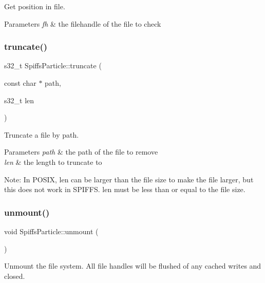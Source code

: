 Get position in file. 


\begin{DoxyParams}{Parameters}
{\em fh} & the filehandle of the file to check \\
\hline
\end{DoxyParams}
\mbox{\label{class_spiffs_particle_af52be85536c06520864bd4918b3fe927}} 
\subsubsection{\texorpdfstring{truncate()}{truncate()}}
{\footnotesize\ttfamily s32\+\_\+t Spiffs\+Particle\+::truncate (\begin{DoxyParamCaption}\item[{const char $\ast$}]{path,  }\item[{s32\+\_\+t}]{len }\end{DoxyParamCaption})\hspace{0.3cm}{\ttfamily [inline]}}



Truncate a file by path. 


\begin{DoxyParams}{Parameters}
{\em path} & the path of the file to remove \\
\hline
{\em len} & the length to truncate to\\
\hline
\end{DoxyParams}
Note\+: In P\+O\+S\+IX, len can be larger than the file size to make the file larger, but this does not work in S\+P\+I\+F\+FS. len must be less than or equal to the file size. \mbox{\label{class_spiffs_particle_a2f1b8abb2c89f1935675240430907f7e}} 
\subsubsection{\texorpdfstring{unmount()}{unmount()}}
{\footnotesize\ttfamily void Spiffs\+Particle\+::unmount (\begin{DoxyParamCaption}{ }\end{DoxyParamCaption})}



Unmount the file system. All file handles will be flushed of any cached writes and closed. 

